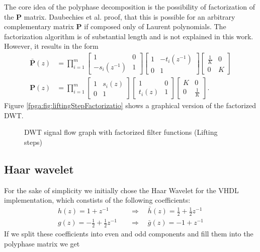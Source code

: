 \begin{refsection}
The core idea of the polyphase decomposition is the possibility of factorization of the $\bm P$ matrix.
Daubechies et al. proof, that this is possible for an arbitrary complementary matrix $\bm P$ if composed only of Laurent polynomials.
The factorization algorithm is of substantial length and is not explained in this work.
However, it results in the form
\begin{align}
	\bm{\bar P}(z) &=
	\prod_{i=1}^{m}
	\begin{bmatrix}
		1 & 0 \\
		-s_i(z^{-1}) & 1
	\end{bmatrix}
	\begin{bmatrix}
		1 & -t_i(z^{-1}) \\
		0 & 1
	\end{bmatrix}
	\begin{bmatrix}
		\frac{1}{K} & 0 \\
		0 & K
	\end{bmatrix}
	\\
	\bm P(z) &=
	\prod_{i=1}^{m}
	\begin{bmatrix}
		1 & s_i(z) \\
		0 & 1
	\end{bmatrix}
	\begin{bmatrix}
		1 & 0 \\
		t_i(z) & 1
	\end{bmatrix}
	\begin{bmatrix}
		K & 0 \\
		0 & \frac{1}{K}
	\end{bmatrix}
	.
\end{align}
Figure \ref{fpga:fig:liftingStepFactorizatio} shows a graphical version of the factorized DWT.
\begin{figure}
	\centering
	
	
	\caption{DWT signal flow graph with factorized filter functions (Lifting steps)}
	\label{fpga:fig:liftingStepFactorization}
\end{figure}


\subsection{Haar wavelet}
\label{fpga:sec:haar}

For the sake of simplicity we initially chose the Haar Wavelet for the VHDL implementation, which constists of the following coefficients:
\begin{align}
h(z) = 1 + z^{-1} \quad & \Rightarrow \quad \bar h(z) = \frac{1}{2} + \frac{1}{2} z^{-1}
\\
g(z) = - \frac{1}{2} + \frac{1}{2} z^{-1} \quad & \Rightarrow \quad \bar g(z) = -1 + z^{-1}
\end{align}
If we split these coefficients into even and odd components and fill them into the polyphase matrix we get 


\end{refsection}
